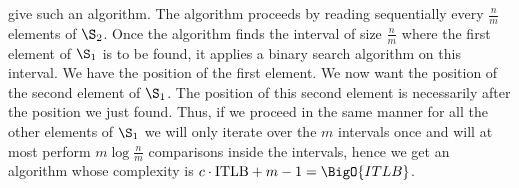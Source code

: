 \citet*{DBLP:journals/siamcomp/HwangL72} give such an algorithm.
The algorithm proceeds by reading sequentially every $\frac{n}{m}$ elements of
$\S_2$. Once the algorithm finds the interval of size $\frac{n}{m}$ where the
first element of $\S_1$ is to be found, it applies a binary search algorithm on
this interval. We have the position of the first element.
We now want the position of the second element of $\S_1$. The position of this
second element is necessarily after the position we just found. Thus, if we
proceed in the same manner for all the other elements of $\S_1$ we will only
iterate over the $m$ intervals once and will at most perform $m
\log\frac{n}{m}$ comparisons inside the intervals, hence we get an algorithm
whose complexity is $c \cdot \text{ITLB} + m - 1 = \BigO{ITLB}$.

